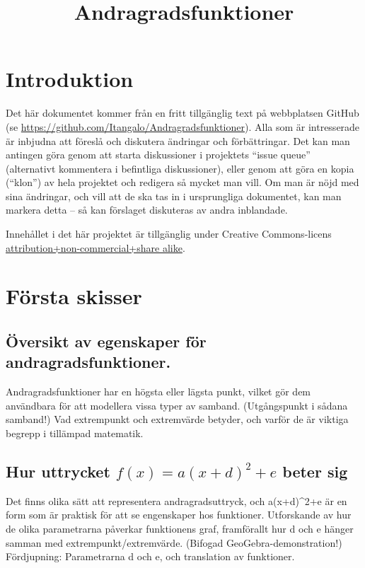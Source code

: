 \documentclass[12pt]{article}
\title{Andragradsfunktioner}
\date{}
\begin{document}
  \maketitle
  
  
  
  \section{Introduktion}
  Det här dokumentet kommer från en fritt tillgänglig text på webbplatsen GitHub (se \url{https://github.com/Itangalo/Andragradsfunktioner}).
  Alla som är intresserade är inbjudna att föreslå och diskutera ändringar och förbättringar.
  Det kan man antingen göra genom att starta diskussioner i projektets ``issue queue'' (alternativt kommentera i befintliga diskussioner), eller genom att göra en kopia (``klon'') av hela projektet och redigera så mycket man vill.
  Om man är nöjd med sina ändringar, och vill att de ska tas in i ursprungliga dokumentet, kan man markera detta -- så kan förslaget diskuteras av andra inblandade.

  Innehållet i det här projektet är tillgänglig under Creative Commons-licens \href{http://creativecommons.org/licenses/by-nc-sa/3.0/}{attribution+non-commercial+share alike}.


  \section{Första skisser}

  \subsection{Översikt av egenskaper för andragradsfunktioner.}
  Andragradsfunktioner har en högsta eller lägsta punkt, vilket gör dem användbara för att modellera vissa typer av samband.
  (Utgångspunkt i sådana samband!)
  Vad extrempunkt och extremvärde betyder, och varför de är viktiga begrepp i tillämpad matematik.

  \subsection{Hur uttrycket $f(x) = a(x+d)^2+e$ beter sig}
  Det finns olika sätt att representera andragradsuttryck, och a(x+d)^2+e är en form som är praktisk för att se engenskaper hos funktioner.
  Utforskande av hur de olika parametrarna påverkar funktionens graf, framförallt hur d och e hänger samman med extrempunkt/extremvärde.
  (Bifogad GeoGebra-demonstration!)
  Fördjupning: Parametrarna d och e, och translation av funktioner.
  
\end{document}
